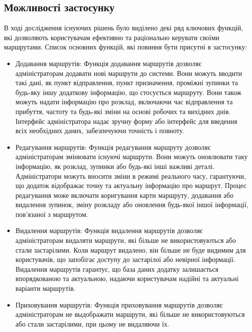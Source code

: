 \subsection{Можливості застосунку}
\label{subsec:features-subsection}

В ході дослідження існуючих рішень було виділено декі ряд ключових функцій, які дозволяють користувачам ефективно та раціонально керувати своїми маршрутами. Список основних функцій, які повиння бути присутні в застосунку:\\

\begin{itemize}
    \item Додавання маршрутів: Функція додавання маршрутів дозволяє адміністраторам додавати нові маршрути до системи. Вони можуть вводити такі дані, як пункт відправлення, пункт призначення, проміжні зупинки та будь-яку іншу додаткову інформацію, що стосується маршруту. Вони також можуть надати інформацію про розклад, включаючи час відправлення та прибуття, частоту та будь-які зміни на основі робочих та вихідних днів.
    Інтерфейс адміністратора надає зручну форму або інтерфейс для введення всіх необхідних даних, забезпечуючи точність і повноту.\\

    \item Редагування маршрутів: Функція редагування маршруту дозволяє адміністраторам змінювати існуючі маршрути. Вони можуть оновлювати таку інформацію, як розклад, зупинки або будь-які інші важливі деталі. Адміністратори можуть вносити зміни в режимі реального часу, гарантуючи, що додаток відображає точну та актуальну інформацію про маршрут. Процес редагування може включати коригування карти маршруту, додавання або видалення зупинок, зміну розкладу або оновлення будь-якої іншої інформації, пов'язаної з маршрутом.\\

    \item Видалення маршрутів: Функція видалення маршрутів дозволяє адміністраторам видаляти маршрути, які більше не використовуються або стали застарілими. Коли маршрут видалено, він більше не буде видимим для користувачів, що запобігає доступу до застарілої або невірної інформації. Видалення маршрутів гарантує, що база даних додатку залишається впорядкованою та актуальною, надаючи користувачам надійні та актуальні варіанти маршрутів.\\

    \item Приховування маршрутів: Функція приховування маршрутів дозволяє адміністраторам не выдображати маршрути, які більше не використовуються або стали застарілими, при цьому не видаляючи їх.\\


\end{itemize}
